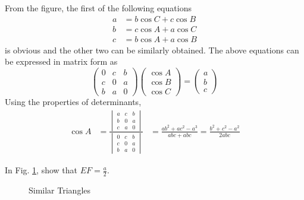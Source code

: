 \proof From the figure, the first of the following equations
%
\begin{align}
a &= b \cos C + c \cos B \\
b &= c \cos A + a \cos C \\
c &= b \cos A + a \cos B
\end{align}
%
is obvious and the other two can be similarly obtained.  The above equations can be expressed in matrix form as
%
\begin{equation}
\begin{pmatrix}
0 & c & b \\
c & 0 & a \\
b & a & 0
\end{pmatrix}
\begin{pmatrix}
\cos A \\
\cos B \\
\cos C
\end{pmatrix}
= 
\begin{pmatrix}
a\\
b\\
c
\end{pmatrix}
\end{equation}
%
Using the properties of determinants,
%
\begin{align}
\cos A &= \frac{
\begin{vmatrix}
a & c & b \\
b & 0 & a \\
c & a & 0
\end{vmatrix}
	}
	{
\begin{vmatrix}
0 & c & b \\
c & 0 & a \\
b & a & 0
\end{vmatrix}
	}
	&=\frac{ab^2 + ac^2 - a^3}{abc + abc} = \frac{b^2 + c^2 - a^2}{2abc}
\end{align}
%
%
\begin{problem}
	In Fig. \ref{ch2_sim_triang}, show that $EF = \frac{a}{2}$.  
\end{problem}
%
\begin{figure}[!h]
	\begin{center}
		
		\resizebox{\columnwidth}{!}{}
	\end{center}
	\caption{Similar Triangles}
	\label{ch2_sim_triang}	
\end{figure}

